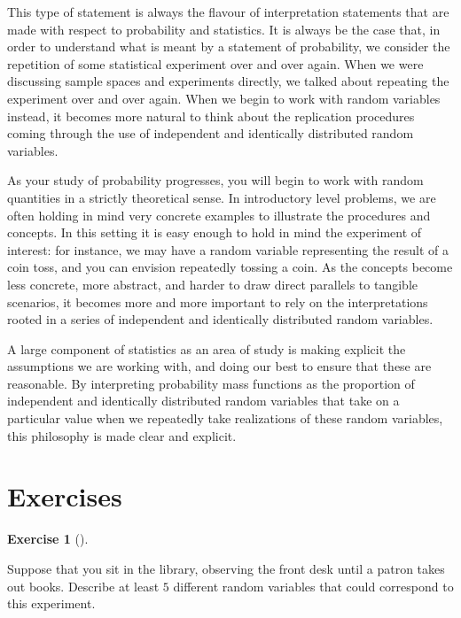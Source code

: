 \documentclass[
  letterpaper,
  DIV=11,
  numbers=noendperiod]{scrreprt}
\theoremstyle{definition}
\newtheorem{exercise}{Exercise}[chapter]
\theoremstyle{definition}
\theoremstyle{definition}
\theoremstyle{remark}
\begin{document}
This type of statement is always the flavour of interpretation
statements that are made with respect to probability and statistics. It
is always be the case that, in order to understand what is meant by a
statement of probability, we consider the repetition of some statistical
experiment over and over again. When we were discussing sample spaces
and experiments directly, we talked about repeating the experiment over
and over again. When we begin to work with random variables instead, it
becomes more natural to think about the replication procedures coming
through the use of independent and identically distributed random
variables.

As your study of probability progresses, you will begin to work with
random quantities in a strictly theoretical sense. In introductory level
problems, we are often holding in mind very concrete examples to
illustrate the procedures and concepts. In this setting it is easy
enough to hold in mind the experiment of interest: for instance, we may
have a random variable representing the result of a coin toss, and you
can envision repeatedly tossing a coin. As the concepts become less
concrete, more abstract, and harder to draw direct parallels to tangible
scenarios, it becomes more and more important to rely on the
interpretations rooted in a series of independent and identically
distributed random variables.

A large component of statistics as an area of study is making explicit
the assumptions we are working with, and doing our best to ensure that
these are reasonable. By interpreting probability mass functions as the
proportion of independent and identically distributed random variables
that take on a particular value when we repeatedly take realizations of
these random variables, this philosophy is made clear and explicit.

\section*{Exercises}\label{exercises-3}


\begin{exercise}[]\protect\hypertarget{exr-5.1}{}\label{exr-5.1}

Suppose that you sit in the library, observing the front desk until a
patron takes out books. Describe at least \(5\) different random
variables that could correspond to this experiment.

\end{exercise}
\end{document}
